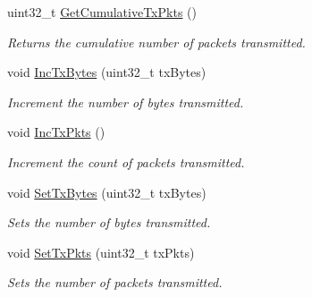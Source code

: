 \begin{DoxyCompactItemize}
uint32\+\_\+t \hyperlink{classRoutingStats_a503d94dc2f14c82bc6a9507b5a493274}{Get\+Cumulative\+Tx\+Pkts} ()
\begin{DoxyCompactList}\small\item\em Returns the cumulative number of packets transmitted. \end{DoxyCompactList}\item 
void \hyperlink{classRoutingStats_a60b24410c8bc02d85a39782d32ed12a4}{Inc\+Tx\+Bytes} (uint32\+\_\+t tx\+Bytes)
\begin{DoxyCompactList}\small\item\em Increment the number of bytes transmitted. \end{DoxyCompactList}\item 
void \hyperlink{classRoutingStats_a427dfd794e824a996f0f4225cf7cb8d9}{Inc\+Tx\+Pkts} ()
\begin{DoxyCompactList}\small\item\em Increment the count of packets transmitted. \end{DoxyCompactList}\item 
void \hyperlink{classRoutingStats_a80ca7a6443435866de87ce8f5ba741f5}{Set\+Tx\+Bytes} (uint32\+\_\+t tx\+Bytes)
\begin{DoxyCompactList}\small\item\em Sets the number of bytes transmitted. \end{DoxyCompactList}\item 
void \hyperlink{classRoutingStats_a627f18ecd70edb02caef24d997ada838}{Set\+Tx\+Pkts} (uint32\+\_\+t tx\+Pkts)
\begin{DoxyCompactList}\small\item\em Sets the number of packets transmitted. \end{DoxyCompactList}\end{DoxyCompactItemize}
